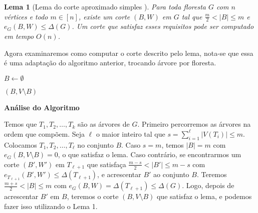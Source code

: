 \documentclass[a4paper,12pt]{article}
\newtheorem{lem}{Lema}
\begin{document}
\bigskip
\bigskip
\bigskip
\bigskip
\bigskip
\bigskip
\bigskip
\bigskip

\begin{lem}[Lema do corte aproximado simples {\cite[Lemma 2]{Schmidt15}}]

	Para toda floresta $G$ com $n$ vértices e todo $m \in [n]$,
	existe um corte $(B,W)$ em $G$ tal que 
	$\frac{m}{2} <|B| \le m$ e
	$e_G(B,W) \le \Delta(G)$.
	Um corte que satisfaz esses requisitos pode ser computado em
	tempo $O(n)$.
\end{lem}

\medskip

Agora examinaremos como computar o corte descrito pelo lema,
nota-se que essa é uma adaptação do algoritmo anterior, 
trocando árvore por floresta.

\medskip
\medskip

\begin{algorithm}[H]

	\caption{Computa corte aproximado simples em uma floresta}
	$B \gets \emptyset$\;

	\Return $(B,V\setminus B)$\;

\end{algorithm}	

\bigskip
\bigskip

\textbf{Análise do Algoritmo}

	Temos que $T_1, T_2, \ldots,T_k $ são 
	as árvores de $G$. 
	Primeiro percorremos as árvores na ordem que compõem. 
	Seja $\ell$ o maior inteiro tal que 
	$s = \displaystyle\sum_{i=1}^{\ell}|V(T_i)| \le m$.
	Colocamos $T_1,T_2, \ldots,T_\ell$ no conjunto $B$.
	Caso $s=m$, temos $|B|=m$ com  $e_G(B,V\setminus B)=0$, o que satisfaz o lema.
	Caso contrário, se encontrarmos um corte $(B',W')$ em $T_{\ell+1}$ que
	satisfaça $\frac{m-s}{2}<|B'|\le m-s$ com $e_{T_{\ell+1}}(B',W') \le 
	\Delta(T_{\ell+1})$, e acrescentar $B'$ ao conjunto
	$B$. Teremos
	$\frac{m+s}{2}<|B| \le m$ com 
	$e_G(B,W) = \Delta(T_{\ell+1}) \le \Delta(G)$.
	Logo, depois de acrescentar $B'$ em $B$, teremos o corte $(B,V\setminus B)$
	que satisfaz o lema, e podemos fazer isso utilizando o Lema 1.
\end{document}
